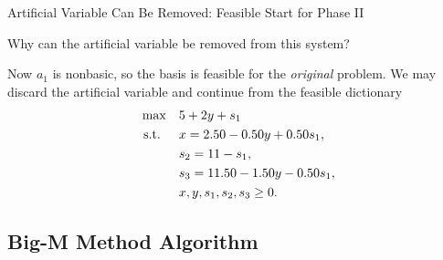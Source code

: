 \begin{remark}{Artificial Variable Can Be Removed: Feasible Start for Phase II}{}
\end{remark}

\begin{learningcheckpoint}[label={lc:artificial-removal}]
Why can the artificial variable be removed from this system?
\end{learningcheckpoint}

Now $a_1$ is nonbasic, so the basis is feasible for the \emph{original} problem. We may discard the artificial variable and continue from the feasible dictionary
\[
\begin{aligned}
\max\quad & 5 + 2y + s_1 \\
\mbox{ s.t. }\quad & x = 2.50 - 0.50y + 0.50s_1,\\
& s_2 = 11 - s_1,\\
& s_3 = 11.50 - 1.50y - 0.50s_1,\\
& x, y, s_1, s_2, s_3 \ge 0.
\end{aligned}
\]

\subsection{Big-M Method Algorithm}

